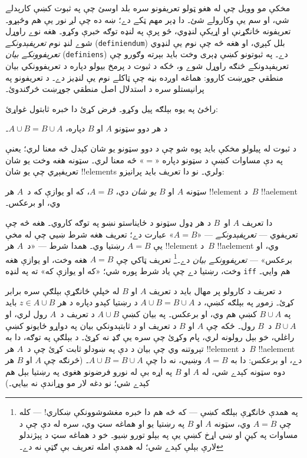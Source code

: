 \documentclass[../../../include/open-logic-section]{subfiles}
\begin{document}


مخکې مو وويل چې له هغو ټولو تعريفونو سره بلد اوسئ چې
په ثبوت کښې کارېدلے شي، او سم يې وکارولے شئ۔ دا ډېر
مهم ټکے دے؛ ښه ده چې لږ نور يې هم وڅېړو۔ تعريفونه
ځانګړنې او اړيکې لنډوي، څو پرې په لنډه توګه خبرې
وکړو۔ هغه نوے راوړل شوے لنډ نوم \emph{تعريفېدونکے}
(\texttt{definiendum}) بلل کېږي، او هغه څه چې نوم يې
لنډوي \emph{تعريفوونکے بيان} (\texttt{definiens}) دے۔
په ثبوتونو کښې ډېری وخت
بايد بېرته وګورو چې تعريفېدونکے څنګه راوړل شوے و،
ځکه د ثبوت د پرمخ بيولو دپاره د تعريفوونکي بيان
منطقي جوړښت کاروو: هماغه اوږده بڼه چې ټاکلے نوم
يې لنډيز دے۔ د تعريفونو په پرانيستلو سره د استدلال
اصل منطقي جوړښت څرګندوئ۔

راځئ په يوه بېلګه پيل وکړو۔ فرض کړئ دا خبره ثابتول غواړئ:

\begin{prop}
د هر دوو سټونو $A$ او $B$ دپاره، $A \cup B = B \cup A$۔
\end{prop}

د ثبوت له پيلولو مخکې بايد پوه شو چې د دوو سټونو
يو شان کېدل څه معنا لري؛ يعنې په دې مساوات کښې د
سټونو دپاره «$=$» څه معنا لري۔ سټونه هغه وخت يو
شان تعريفېږي چې يو شان !!{element}s ولري۔ نو دا
تعريف بايد پرانيزو:

\begin{defn}
سټونه $A$ او $B$ \emph{يو شان} دي، $A = B$، که او يوازې
که د~$A$ هر !!{element} د~$B$ !!a{element} وي، او برعکس۔
\end{defn}

دا تعريف $A$ او~$B$ د هر ډول سټونو د ځايناستو
نښو په توګه کاروي۔ هغه څه چې تعريفوي --- \emph{تعريفېدونکے}
--- «$A = B$» عبارت دے؛ تعريف هغه شرط ښيي چې
له مخې يې $A = B$ رښتيا وي۔ همدا شرط --- «د~$A$ هر
!!{element} د~$B$ !!a{element} وي، او برعکس» ---
\emph{تعريفوونکے بيان} دے۔\footnote{په همدې ځانګړې
  بېلګه کښې --- که څه هم دا خبره مغشوشوونکې ښکاري! ---
  کله چې $A = B$ وي، سټونه $A$ او $B$ په رښتيا يو
  او هماغه سټ وي، سره له دې چې د مساوات په کيڼ
  او ښي اړخ کښې يې په بېلو تورو ښيو۔ خو د هماغه
  سټ د پېژندلو لارې بېلې کېدے شي؛ له همدې امله
  تعريف بې ګټې نه دے۔} تعريف ټاکي چې $A = B$
هغه وخت، او يوازې هغه وخت، رښتيا دے چې ياد شرط
پوره شي؛ «که او يوازې که» ته په لنډه \texttt{iff} هم وايي۔

د تعريف د کارولو پر مهال بايد د تعريف $A$ او $B$
له خپلې ځانګړې بېلګې سره برابر کړئ۔ زموږ په بېلګه
کښې، د $A \cup B = B \cup A$ د رښتيا کېدو دپاره د
هر $z \in A \cup B$ بايد په $B \cup A$ کښې هم
وي، او برعکس۔ په بيان کښې $A \cup B$ د تعريف
د~$A$ رول لري، او $B \cup A$ د~$B$ رول۔ ځکه چې
$A$ او $B$ د تعريف او د ثابتېدونکي بيان په دواړو
ځايونو کښې راغلي، خو بېل رولونه لري، پام وکړئ
چې سره يې ګډ نه کړئ۔ د بېلګې په توګه، دا به
تېروتنه وي چې بيان د دې په ښودلو ثابت کړئ چې
د~$A$ هر !!{element} د~$B$ !!a{element} دے، او
برعکس: دا به $A = B$ وښيي، نه دا چې
$A \cup B = B \cup A$۔ (څرنګه چې $A$ او $B$
هر دوه سټونه کېدے شي، له $A$ او $B$ په اړه
بې له نورو فرضونو هغوی په رښتيا بېل هم
کېدے شي؛ نو دغه لار
مو وړاندې نه بيايي۔)
\end{document}
